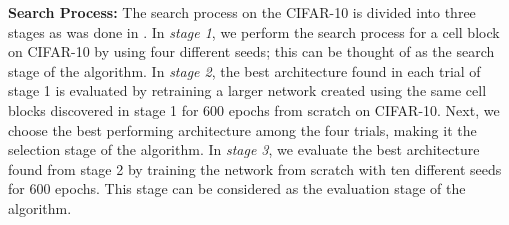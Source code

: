 \documentclass[final]{cvpr}
\begin{document}
\textbf{Search Process:} The search process on the CIFAR-10 is divided into three stages as was done in
\cite{liu2018darts2}\cite{li2019random}. In \textit{stage 1}, we perform the search process for a
cell block on CIFAR-10 by using four different seeds; this can be thought of as the search stage
of the algorithm. In \textit{stage 2}, the best architecture found in each trial of stage 1 is
evaluated by retraining a larger network created using the same cell blocks discovered in stage 1
for 600 epochs from scratch on CIFAR-10. Next, we choose the best performing architecture among
the four trials, making it the selection stage of the algorithm. In \textit{stage 3}, we evaluate
the best architecture found from stage 2 by training the network from scratch with ten different
seeds for 600 epochs. This stage can be considered as the evaluation stage of the algorithm.
\end{document}
